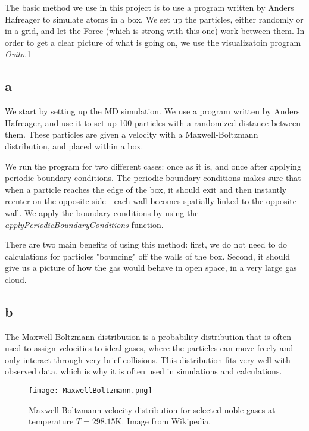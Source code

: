\documentclass[10pt,showpacs,preprintnumbers,footinbib,amsmath,amssymb,aps,prl,twocolumn,groupedaddress,superscriptaddress,showkeys]{revtex4-1}
\begin{document}
The basic method we use in this project is to use a program written by Anders Hafreager to simulate atoms in a box. We set up the particles, either randomly or in a grid, and let the Force (which is strong with this one) work between them. In order to get a clear picture of what is going on, we use the visualizatoin program \textit{Ovito}.1

\subsection*{a}

We start by setting up the MD simulation. We use a program written by Anders Hafreager, and use it to set up 100 particles with a randomized distance between them. These particles are given a velocity with a Maxwell-Boltzmann distribution, and placed within a box.

We run the program for two different cases: once as it is, and once after applying periodic boundary conditions. The periodic boundary conditions makes sure that when a particle reaches the edge of the box, it should exit and then instantly reenter on the opposite side - each wall becomes spatially linked to the opposite wall. We apply the boundary conditions by using the \textit{applyPeriodicBoundaryConditions} function.

There are two main benefits of using this method: first, we do not need to do calculations for particles "bouncing" off the walls of the box. Second, it should give us a picture of how the gas would behave in open space, in a very large gas cloud.


\subsection*{b}

The Maxwell-Boltzmann distribution is a probability distribution that is often used to assign velocities to ideal gases, where the particles can move freely and only interact through very brief collisions. This distribution fits very well with observed data, which is why it is often used in simulations and calculations.

\begin{figure}
	\centering
	\texttt{[image: MaxwellBoltzmann.png]}
	\caption{Maxwell Boltzmann velocity distribution for selected noble gases at temperature $T = 298.15\mathrm{K}$. Image from Wikipedia.}
	\label{fig:5a_MaxBoltz}
\end{figure}
\end{document}
